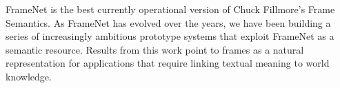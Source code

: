 FrameNet is the best currently operational version of Chuck Fillmore's Frame Semantics. As FrameNet has evolved over the years, we have been building a series of increasingly ambitious prototype systems that exploit FrameNet as a semantic resource. Results from this work point to frames as a natural representation for applications that require linking textual meaning to world knowledge.
